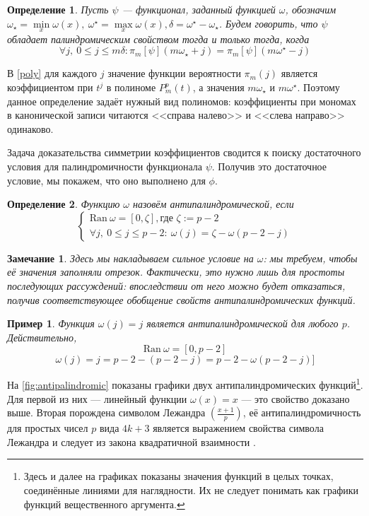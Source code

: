 \documentclass[14pt, a4paper, russian]{report}
\newtheorem{remark}{\indent Замечание}
\newtheorem{definition}{\indent Определение}
\newtheorem{example}{\indent Пример}
\begin{document}
\begin{definition}\label{palindromic}
Пусть $\psi$ --- функционал, заданный функцией $\omega$, обозначим $\omega_\star = \min\limits_x \omega(x),\ \omega^\star = \max\limits_x \omega(x), \delta=\omega^\star - \omega_\star$. Будем говорить, что  $\psi$  \emph{обладает палиндромическим свойством} тогда и только тогда, когда
$$
\forall j,\ 0 \le j \le m\delta:   \pi_m[\psi](m\omega_\star + j)=\pi_m[\psi](m\omega^\star-j)
$$
\end{definition}

В \cref{poly} для каждого $j$ значение функции вероятности $\pi_m(j)$ является коэффициентом при $t^j$ в полиноме $P_m^p(t)$, а значения $m\omega_\star$ и $m\omega^\star$. Поэтому данное определение задаёт нужный вид полиномов: коэффициенты при мономах в канонической записи читаются <<справа налево>> и <<слева направо>> одинаково.

Задача доказательства симметрии коэффициентов сводится к поиску достаточного условия для палиндромичности функционала $\psi$. Получив это достаточное условие, мы покажем, что оно выполнено для $\phi$.

\begin{definition}\label{antipalindromic}
Функцию $\omega$ назовём \emph{антипалиндромической}, если
\[\begin{cases}
	\mathrm{Ran }\ \omega = \left[0, \zeta\right], \text{где } \zeta := p-2 \\
	\forall j,\ 0 \le j \le p-2: \  \omega(j) = \zeta - \omega(p-2-j)
\end{cases}\]
\end{definition}
\begin{remark}
Здесь мы накладываем сильное условие на $\omega$: мы требуем, чтобы её значения заполняли отрезок. Фактически, это нужно лишь для простоты последующих рассуждений: впоследствии от него можно будет отказаться, получив соответствующее обобщение свойств антипалиндромических функций.
\end{remark}


\begin{example} \label{classic_omega}
Функция $\omega(j)=j$ является антипалиндромической для любого $p$. Действительно,
$$
\mathrm{Ran }\ \omega = \left[0, p-2\right]
$$
$$
\omega(j) = j = p-2 - (p-2-j) = p-2 - \omega(p-2-j)]
$$
\end{example}

На \cref{fig:antipalindromic} показаны графики двух антипалиндромических функций\footnote{Здесь и далее на графиках показаны значения функций в целых точках, соединённые линиями для наглядности. Их не следует понимать как графики функций вещественного аргумента.}. Для первой из них --- линейный функции $\omega(x)=x$ --- это свойство доказано выше. Вторая порождена символом Лежандра $(\frac{x+1}{p})$, её антипалиндромичность для простых чисел $p$ вида $4k+3$ является выражением свойства символа Лежандра и следует из закона квадратичной взаимности \cite{vinogradov}.
\end{document}
